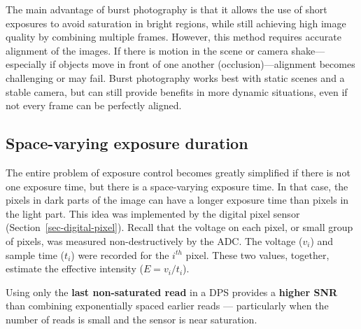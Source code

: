 \documentclass[
  letterpaper,
]{book}
\begin{document}
The main advantage of burst photography is that it allows the use of
short exposures to avoid saturation in bright regions, while still
achieving high image quality by combining multiple frames. However, this
method requires accurate alignment of the images. If there is motion in
the scene or camera shake---especially if objects move in front of one
another (occlusion)---alignment becomes challenging or may fail. Burst
photography works best with static scenes and a stable camera, but can
still provide benefits in more dynamic situations, even if not every
frame can be perfectly aligned.

\subsection{Space-varying exposure duration}\label{sec-exposure-dps}

The entire problem of exposure control becomes greatly simplified if
there is not one exposure time, but there is a space-varying exposure
time. In that case, the pixels in dark parts of the image can have a
longer exposure time than pixels in the light part. This idea was
implemented by the digital pixel sensor
(Section~\ref{sec-digital-pixel}). Recall that the voltage on each
pixel, or small group of pixels, was measured non-destructively by the
ADC. The voltage (\(v_i\)) and sample time (\(t_i\)) were recorded for
the \(i^{th}\) pixel. These two values, together, estimate the effective
intensity (\(E = v_i / t_i\)).

Using only the \textbf{last non-saturated read} in a DPS provides a
\textbf{higher SNR} than combining exponentially spaced earlier reads
--- particularly when the number of reads is small and the sensor is
near saturation.
\end{document}
